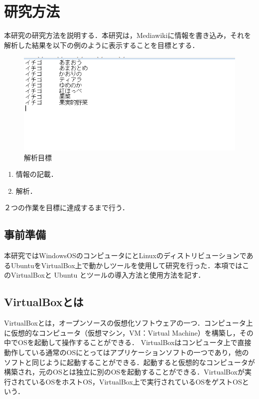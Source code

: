 \section{研究方法}

本研究の研究方法を説明する．本研究は，Mediawikiに情報を書き込み，それを解析した結果を以下の例のように表示することを目標とする．

\begin{figure}[!htb]
\centering
\includegraphics[width=18cm]{reidai.png}
\caption{解析目標}\label{kaiseki2}
\end{figure}

\begin{enumerate}
\item 情報の記載．
\item 解析．
\end{enumerate}
２つの作業を目標に達成するまで行う．




\subsection{事前準備}
本研究ではWindowsOSのコンピュータにとLinuxのディストリビューションであるUbuntuをVirtualBox上で動かしツールを使用して研究を行った．本項ではこのVirtualBoxと Ubuntu とツールの導入方法と使用方法を記す．

\subsection{VirtualBoxとは}
VirtualBoxとは，オープンソースの仮想化ソフトウェアの一つ．コンピュータ上に仮想的なコンピュータ（仮想マシン，VM：Virtual Machine）を構築し，その中でOSを起動して操作することができる．
VirtualBoxはコンピュータ上で直接動作している通常のOSにとってはアプリケーションソフトの一つであり，他のソフトと同じように起動することができる．起動すると仮想的なコンピュータが構築され，元のOSとは独立に別のOSを起動することができる．VirtualBoxが実行されているOSをホストOS，VirtualBox上で実行されているOSをゲストOSという．


